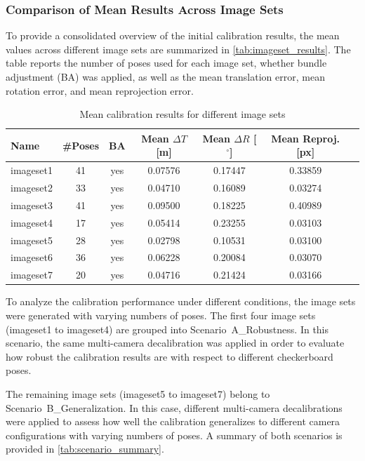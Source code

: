 \documentclass[12pt]{scrartcl}
\begin{document}
\subsubsection{Comparison of Mean Results Across Image Sets}

To provide a consolidated overview of the initial calibration results, the mean values across different image sets are summarized in \autoref{tab:imageset_results}. The table reports the number of poses used for each image set, whether bundle adjustment (BA) was applied, as well as the mean translation error, mean rotation error, and mean reprojection error.
\vspace{0.2cm}

\begin{table}[htbp]
\centering
\begin{tabular}{lcccccc}
\hline
Name & \#Poses & BA & Mean $\Delta T$ [m] & Mean $\Delta R$ [$^\circ$] & Mean Reproj. [px] \\
\hline
imageset1 & 41 & yes & 0.07576 & 0.17447 & 0.33859 \\
imageset2 & 33 & yes & 0.04710 & 0.16089 & 0.03274 \\
imageset3 & 41 & yes & 0.09500 & 0.18225 & 0.40989 \\
imageset4 & 17 & yes & 0.05414 & 0.23255 & 0.03103 \\
\hline
imageset5 & 28 & yes & 0.02798 & 0.10531 & 0.03100 \\
imageset6 & 36 & yes & 0.06228 & 0.20084 & 0.03070 \\
imageset7 & 20 & yes & 0.04716 & 0.21424 & 0.03166 \\
\hline
\end{tabular}
\caption{Mean calibration results for different image sets}
\label{tab:imageset_results}
\end{table}

\vspace{0.2cm}

To analyze the calibration performance under different conditions, the image sets were generated with varying numbers of poses. The first four image sets (imageset1 to imageset4) are grouped into Scenario~A\_Robustness. In this scenario, the same multi-camera decalibration was applied in order to evaluate how robust the calibration results are with respect to different checkerboard poses. 
\newline

The remaining image sets (imageset5 to imageset7) belong to Scenario~B\_Generalization. In this case, different multi-camera decalibrations were applied to assess how well the calibration generalizes to different camera configurations with varying numbers of poses. A summary of both scenarios is provided in \autoref{tab:scenario_summary}.
\vspace{0.2cm}
\end{document}
